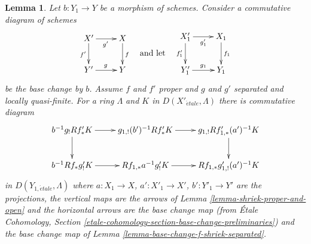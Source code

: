 \documentclass{stacks-project}
\theoremstyle{plain}
\newtheorem{lemma}[subsection]{Lemma}
\theoremstyle{definition}
\theoremstyle{remark}
\numberwithin{equation}{subsection}
\def\etale{{\acute{e}tale}}
\begin{document}
\begin{lemma}
\label{lemma-shriek-proper-and-open-base-change}
Let $b : Y_1 \to Y$ be a morphism of schemes. Consider a commutative diagram
of schemes
$$
\vcenter{
\xymatrix{
X' \ar[r]_{g'} \ar[d]_{f'} & X \ar[d]^f \\
Y' \ar[r]^g & Y
}
}
\quad\text{and let}\quad
\vcenter{
\xymatrix{
X'_1 \ar[r]_{g'_1} \ar[d]_{f'_1} & X_1 \ar[d]^{f_1} \\
Y'_1 \ar[r]^{g_1} & Y_1
}
}
$$
be the base change by $b$. Assume $f$ and $f'$ proper and
$g$ and $g'$ separated and locally quasi-finite.
For a ring $\Lambda$ and $K$ in $D(X'_\etale, \Lambda)$
there is commutative diagram
$$
\xymatrix{
b^{-1}g_!Rf'_*K \ar[d] \ar[r] &
g_{1, !}(b')^{-1}Rf'_*K \ar[r] &
g_{1, !}Rf'_{1, *}(a')^{-1}K \ar[d] \\
b^{-1}Rf_*g'_!K \ar[r] &
Rf_{1, *}a^{-1}g'_!K \ar[r] &
Rf_{1, *}g'_{1, !}(a')^{-1}K
}
$$
in $D(Y_{1, \etale}, \Lambda)$ where $a : X_1 \to X$, $a' : X'_1 \to X'$,
$b' : Y'_1 \to Y'$ are the projections, the vertical maps are the arrows
of Lemma \ref{lemma-shriek-proper-and-open}
and the horizontal arrows are the base change map
(from \'Etale Cohomology, Section
\ref{etale-cohomology-section-base-change-preliminaries})
and the base change map of Lemma \ref{lemma-base-change-f-shriek-separated}.
\end{lemma}
\end{document}
